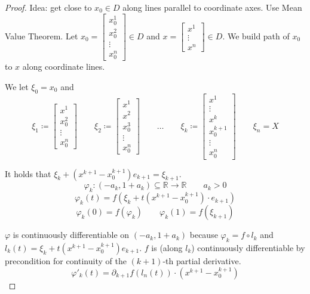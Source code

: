 \documentclass[a4paper,landscape,twocolumn]{article}
\theoremstyle{definition}
\begin{document}
\begin{proof}
  Idea: get close to $x_0 \in D$ along lines parallel to coordinate axes.
  Use Mean Value Theorem. Let $x_0 = \begin{bmatrix} x_0^1 \\ x_0^2 \\ \vdots \\ x_0^n \end{bmatrix} \in D$
  and $x = \begin{bmatrix} x^1 \\ \vdots \\ x^n \end{bmatrix} \in D$.
  We build path of $x_0$ to $x$ along coordinate lines.

  We let $\xi_0 = x_0$ and
  \[
  \xi_1 \coloneqq \begin{bmatrix} x^1 \\ x_0^2 \\ \vdots \\ x_0^n \end{bmatrix} \qquad
  \xi_2 \coloneqq \begin{bmatrix} x^1 \\ x^2 \\ x_0^3 \\ \vdots \\ x_0^n \end{bmatrix} \qquad
  \ldots \qquad
  \xi_k \coloneqq \begin{bmatrix} x^1 \\ \vdots \\ x^k \\ x_0^{k+1} \\ \vdots \\ x_0^n \end{bmatrix} \qquad
  \xi_n = X
  \]

  It holds that $\xi_k + (x^{k+1} - x_0^{k+1}) e_{k+1} = \xi_{k+1}$.
  \[ \varphi_k: (-a_k, 1 + a_k) \subseteq \mathbb R \to \mathbb R \qquad a_k > 0 \]
  \[ \varphi_k(t) = f(\xi_k + t(x^{k+1} - x_0^{k+1}) \cdot e_{k+1}) \]
  \[ \varphi_k(0) = f(\varphi_k) \qquad \varphi_k(1) = f(\xi_{k+1}) \]

  $\varphi$ is continuously differentiable on $(-a_k, 1 + a_k)$ because $\varphi_k = f \circ l_k$
  and $l_k(t) = \xi_k + t(x^{k+1} - x_0^{k+1}) e_{k+1}$. $f$ is (along $l_k$) continuously differentiable
  by precondition for continuity of the $(k+1)$-th partial derivative.
  \[ \varphi'_k(t) = \partial_{k+1} f(l_n(t)) \cdot (x^{k+1} - x_0^{k+1}) \]
\end{proof}
\end{document}
